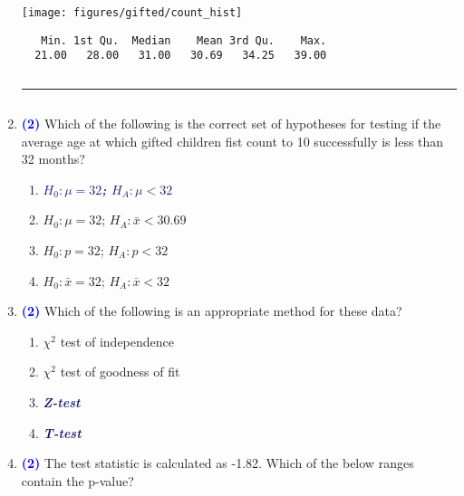 \documentclass[11pt]{article}
\newcommand{\solnMult}[1]{\textbf{\textcolor{MidnightBlue}{\textit{#1}}}}	%
\newcommand{\pts}[1]{ \textbf{{\footnotesize \textcolor{blue}{(#1)}}} }	%
\begin{document}
\begin{enumerate}
\begin{minipage}[c]{0.5\textwidth}
\begin{center}
\texttt{[image: figures/gifted/count\_hist]}
\end{center}
\end{minipage}
\begin{minipage}[c]{0.5\textwidth}
\begin{center}
{\footnotesize
\begin{verbatim}
   Min. 1st Qu.  Median    Mean 3rd Qu.    Max. 
  21.00   28.00   31.00   30.69   34.25   39.00 
\end{verbatim}
}\end{center}
\end{minipage}
$\:$ \\
\hrule
$\:$

\item \pts{2} \label{countF} Which of the following is the correct set of hypotheses for testing if the average age at which gifted children fist count to 10 successfully is less than 32 months?

\begin{multicols}{2}
\begin{enumerate}
\item \solnMult{$H_0: \mu = 32$; $H_A: \mu < 32$}
\item $H_0: \mu = 32$; $H_A: \bar{x} < 30.69$
\item $H_0: p = 32$; $H_A: p < 32$
\item $H_0: \bar{x} = 32$; $H_A: \bar{x} < 32$
\end{enumerate}
\end{multicols}

\item \pts{2} Which of the following is an appropriate method for these data?

\begin{multicols}{2}
\begin{enumerate}
\item $\chi^2$ test of independence
\item $\chi^2$ test of goodness of fit
\item \solnMult{Z-test}
\item \solnMult{T-test}
\end{enumerate}
\end{multicols}

\item \pts{2} The test statistic is calculated as -1.82. Which of the below ranges contain the p-value?


\end{enumerate}
\end{document}
